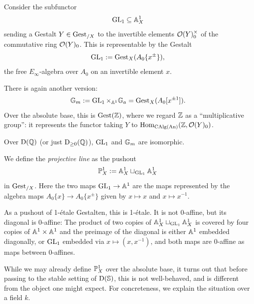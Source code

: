 \documentclass[11pt]{book}
\begin{document}
	\begin{example}
		Consider the subfunctor
		\[
			\operatorname{GL}_1 \subseteq \mathbb{A}^1_X
		\]
		sending a Gestalt $Y \in {\textup{Gest}}_{/X}$ to the invertible elements $\mathcal{O}(Y)^{\times}_0$ of the commutative ring $\mathcal{O}(Y)_0$. This is representable by the Gestalt
		\[
			\operatorname{GL}_1 := {\textup{Gest}}_X(A_0\{x^{\pm}\}),
		\]
		the free $E_{\infty}$-algebra over $A_0$ on an invertible element $x$.

		There is again another version:
		\[
			\mathbb{G}_m := \operatorname{GL}_1 \times_{\mathbb{A}^1} \mathbb{G}_a = {\textup{Gest}}_X(A_0[x^{\pm1}]).
		\]
		Over the absolute base, this is ${\textup{Gest}}(\operatorname{\mathbb Z})$, where we regard $\operatorname{\mathbb Z}$ as a ``multiplicative group'': it represents the functor taking $Y$ to $\operatorname{Hom}_{{\textup{CAlg}}({\textup{An}})}(\operatorname{\mathbb Z},\mathcal{O}(Y)_0)$.

		Over $\operatorname{\mathrm{D}}(\operatorname{\mathbb Q})$ (or just $\operatorname{\mathrm{D}}_{\geq 0}(\operatorname{\mathbb Q})$), $\operatorname{GL}_1$ and $\mathbb{G}_m$ are isomorphic.
	\end{example}

	\begin{example}
		We define the \emph{projective line} as the pushout
		\[
			\mathbb{P}^1_X := \mathbb{A}^1_X \sqcup_{\operatorname{GL}_1} \mathbb{A}^1_X
		\]
		in ${\textup{Gest}}_{/X}$. Here the two maps $\operatorname{GL}_1 \to \mathbb{A}^1$ are the maps represented by the algebra maps $A_0\{x\} \to A_0\{x^{\pm}\}$ given by $x \mapsto x$ and $x \mapsto x^{-1}$.

		As a pushout of 1-étale Gestalten, this is 1-étale. It is not 0-affine, but its diagonal is 0-affine: The product of two copies of $\mathbb{A}^1_X \sqcup_{\operatorname{GL}_1} \mathbb{A}^1_X$ is covered by four copies of $\mathbb{A}^1 \times \mathbb{A}^1$ and the preimage of the diagonal is either $\mathbb{A}^1$ embedded diagonally, or $\operatorname{GL}_1$ embedded via $x \mapsto (x,x^{-1})$, and both maps are $0$-affine as maps between $0$-affines.
	\end{example}

	While we may already define $\mathbb{P}^1_X$ over the absolute base, it turns out that before passing to the stable setting of $\operatorname{\mathrm{D}}(\operatorname{\mathbb S})$, this is not well-behaved, and is different from the object one might expect. For concreteness, we explain the situation over a field $k$.
\end{document}
